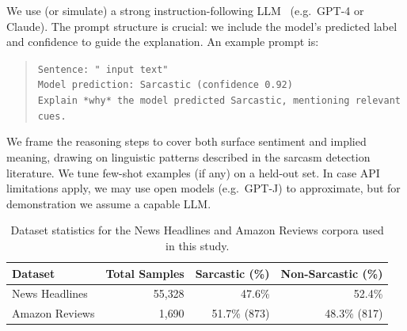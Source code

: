 We use (or simulate) a strong instruction-following LLM~\cite{openai2023gpt4} (e.g.\ GPT-4 or Claude). The prompt structure is crucial: we include the model's predicted label and confidence to guide the explanation. An example prompt is:

\begin{quote}
\small
\texttt{Sentence: " input text"}\\

\texttt{Model prediction: Sarcastic (confidence 0.92)}\\
\texttt{Explain *why* the model predicted Sarcastic, mentioning relevant cues.}
\end{quote}

We frame the reasoning steps to cover both surface sentiment and implied meaning, drawing on linguistic patterns described in the sarcasm detection literature. We tune few-shot examples (if any) on a held-out set. In case API limitations apply, we may use open models (e.g.\ GPT-J) to approximate, but for demonstration we assume a capable LLM.

\begin{table}[htbp]
\caption{Dataset statistics for the News Headlines and Amazon Reviews corpora used in this study.}
\label{tab:dataset_stats}
\begin{tabular}{lrrr}
\toprule
\textbf{Dataset} & \textbf{Total Samples} & \textbf{Sarcastic (\%)} & \textbf{Non-Sarcastic (\%)} \\
\midrule
News Headlines       & 55{,}328 & 47.6\% & 52.4\% \\
Amazon Reviews       & 1{,}690  & 51.7\% (873) & 48.3\% (817) \\
\bottomrule
\end{tabular}
\end{table}
